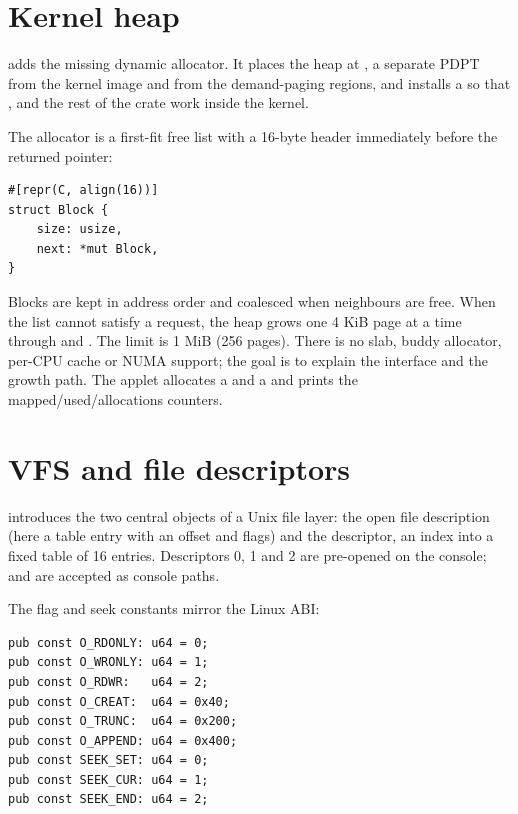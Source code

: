\section{Kernel heap}

 adds the missing dynamic allocator. It places the heap at
, a separate PDPT from the kernel image and from the
demand-paging regions, and installs a  so that
,  and the rest of the
 crate work inside the kernel.

The allocator is a first-fit free list with a 16-byte header immediately
before the returned pointer:

\begin{lstlisting}[caption={Block header and free-list node.},label={lst:heapblock}]
#[repr(C, align(16))]
struct Block {
    size: usize,
    next: *mut Block,
}
\end{lstlisting}

Blocks are kept in address order and coalesced when neighbours are free.
When the list cannot satisfy a request, the heap grows one 4 KiB page at a
time through  and . The
limit is 1 MiB (256 pages). There is no slab, buddy allocator, per-CPU cache
or NUMA support; the goal is to explain the interface and the growth path.
The  applet allocates a  and a  and
prints the mapped/used/allocations counters.

\section{VFS and file descriptors}

 introduces the two central objects of a Unix file layer:
the open file description (here a table entry with an offset and flags) and
the descriptor, an index into a fixed table of 16 entries. Descriptors 0, 1
and 2 are pre-opened on the console;  and 
are accepted as console paths.

The flag and seek constants mirror the Linux ABI:

\begin{lstlisting}[caption={Subset of the VFS constants.},label={lst:vfsflags}]
pub const O_RDONLY: u64 = 0;
pub const O_WRONLY: u64 = 1;
pub const O_RDWR:   u64 = 2;
pub const O_CREAT:  u64 = 0x40;
pub const O_TRUNC:  u64 = 0x200;
pub const O_APPEND: u64 = 0x400;
pub const SEEK_SET: u64 = 0;
pub const SEEK_CUR: u64 = 1;
pub const SEEK_END: u64 = 2;
\end{lstlisting}

